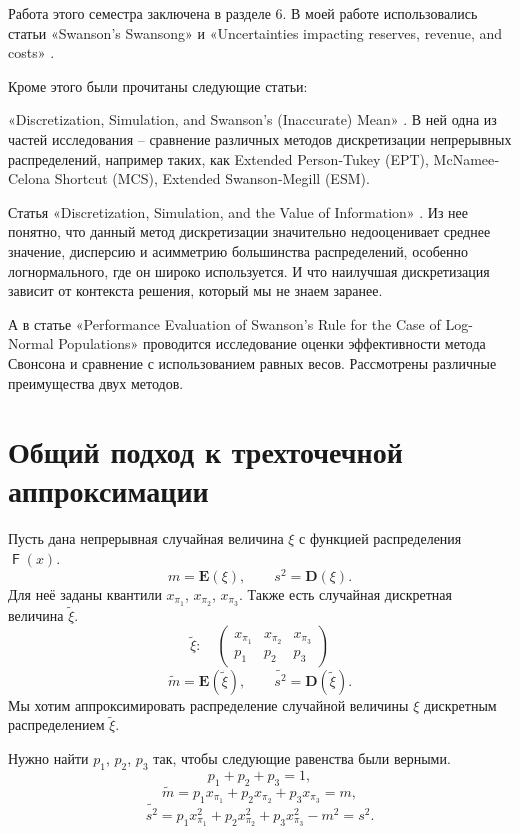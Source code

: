 \documentclass[12pt]{article}
\DeclareMathOperator{\F}{\mathsf{F}}
\begin{document}
	Работа этого семестра заключена в разделе 6. В моей работе использовались статьи «Swanson's Swansong» \cite{Swansong} и «Uncertainties impacting reserves, revenue, and costs» \cite{Uncertainties}.
	
	Кроме этого были прочитаны следующие статьи:
	
	«Discretization, Simulation, and Swanson's (Inaccurate) Mean» \cite{Discretization}. В ней одна из частей исследования -- сравнение различных методов дискретизации непрерывных распределений, например таких, как Extended Person‐Tukey (EPT), McNamee‐Celona Shortcut (MCS), Extended Swanson‐Megill (ESM).
	
	Статья «Discretization, Simulation, and the Value of Information» \cite{Simulation}.
	Из нее понятно, что данный метод дискретизации значительно недооценивает среднее значение, дисперсию и асимметрию большинства распределений, особенно логнормального, где он широко используется. И что наилучшая дискретизация зависит от контекста решения, который мы не знаем заранее.
	
	А в статье «Performance Evaluation of Swanson’s Rule for the Case of Log-Normal Populations» \cite{Performance} проводится исследование оценки эффективности метода Свонсона и сравнение с использованием равных весов. Рассмотрены различные преимущества двух методов.
	
	\section{Общий подход к трехточечной аппроксимации}
	
	Пусть дана непрерывная случайная величина $\xi$ с функцией распределения $\F(x)$. \[m = \mathbf E(\xi), \quad\quad s^{2} = \mathbf D(\xi).\]
	Для неё заданы квантили $x_{\pi_{1}}$, $x_{\pi_{2}}$, $x_{\pi_{3}}$. Также есть случайная дискретная величина $\tilde{\xi}$.
	\[\tilde{\xi}:\quad\begin{pmatrix} 
		x_{\pi_{1}}&x_{\pi_{2}}&x_{\pi_{3}}\\ 
		p_{1} &  p_{2}  & p_{3}
	\end{pmatrix}\]
	\[\tilde{m} = \mathbf E(\tilde{\xi}), \quad\quad \tilde{s^{2}} = \mathbf D(\tilde{\xi}).\]
	Мы хотим аппроксимировать распределение случайной величины $\xi$ дискретным распределением $\tilde{\xi}$.
	
	Нужно найти $p_{1}$, $p_{2}$, $p_{3}$ так, чтобы следующие равенства были верными.
	\begin{equation}
		p_{1} + p_{2} + p_{3} = 1, \label{1}
	\end{equation}
	\begin{equation}
		\tilde{m} = p_{1}x_{\pi_{1}} + p_{2}x_{\pi_{2}} + p_{3}x_{\pi_{3}} = m, \label{2}
	\end{equation}
	\begin{equation}
		\tilde{s^{2}} = p_{1} x_{\pi_{1}}^{2} + p_{2} x_{\pi_{2}}^{2} + p_{3} x_{\pi_{3}}^{2} - m^{2} = s^{2}. \label{3}
	\end{equation}
	
\end{document}
